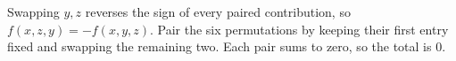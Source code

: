Swapping $ y,z $ reverses the sign of every paired contribution, so $ f(x,z,y)=-f(x,y,z)$. Pair the six permutations by keeping their first entry fixed and swapping the remaining two. Each pair sums to zero, so the total is $\boxed0 $.
